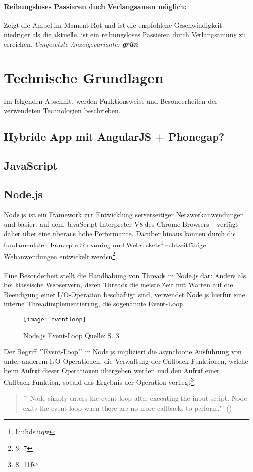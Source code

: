 \paragraph{Reibungsloses Passieren duch Verlangsamen möglich:} Zeigt die Ampel im Moment Rot und ist die empfohlene Geschwindigkeit niedriger als die aktuelle, ist ein reibungsloses Passieren durch Verlangsamung zu erreichen.
\textit{Umgesetzte Anzeigevariante: \textbf{grün}}
\section{Technische Grundlagen}
Im folgenden Abschnitt werden Funktionsweise und Besonderheiten der verwendeten Technologien beschrieben.
\subsection{Hybride App mit AngularJS + Phonegap?}
\subsection{JavaScript}
\subsection{\label{Node.js}Node.js}
Node.js ist ein Framework zur Entwicklung serverseitiger Netzwerkanwendungen und basiert auf dem JavaScript Interpreter V8 des Chrome Browsers -- verfügt daher über eine überaus hohe Performance. Darüber hinaus können durch die fundamentalen Konzepte Streaming und Websockets\footnote{hiuhdsiuqw} echtzeitfähige Webanwendungen entwickelt werden\footnote{\cite{nodeCo} S. 7}. \\\\
Eine Besonderheit stellt die Handhabung von Threads in Node.js dar:
Anders als bei klassische Webservern, deren Threads die meiste Zeit mit Warten auf die Beendigung einer I/O-Operation beschäftigt sind, verwendet Node.js hierfür eine interne Threadimplementierung, die sogenannte Event-Loop. 
\begin{figure}[H]
 \centering
    \texttt{[image: eventloop]}
\caption[Node.js Event-Loop]{Node.js Event-Loop Quelle: \cite{nodeWay} S. 3}
\label{fig:Nodejs_eventloop}
\end{figure}
Der Begriff "'Event-Loop"' in Node.js impliziert die asynchrone Ausführung von unter anderem I/O-Operationen, die Verwaltung der Callback-Funktionen, welche beim Aufruf dieser Operationen übergeben werden und den Aufruf einer Callback-Funktion, sobald das Ergebnis der Operation vorliegt\footnote{\cite{nodeCo} S. 11f}.
\begin{quote}
"' Node simply enters the event loop after executing the input script. Node exits the event loop when there are no more callbacks to perform."' (\cite{node})
\end{quote}

